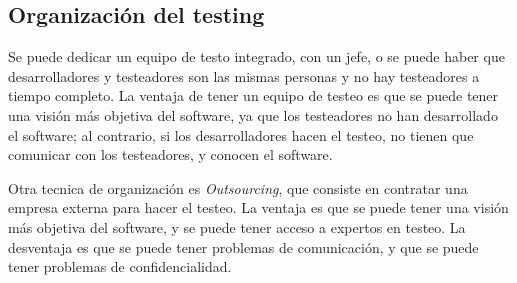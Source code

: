 \subsection{Organización del testing}
Se puede dedicar un equipo de testo integrado, con un jefe, o se puede haber que desarrolladores y testeadores son las mismas personas y no hay testeadores a tiempo completo.
La ventaja de tener un equipo de testeo es que se puede tener una visión más objetiva del software, ya que los testeadores no han desarrollado el software; al contrario, si los desarrolladores hacen el testeo, no tienen que comunicar con los testeadores, y conocen el software.

Otra tecnica de organización es \textit{Outsourcing}, que consiste en contratar una empresa externa para hacer el testeo. La ventaja es que se puede tener una visión más objetiva del software, y se puede tener acceso a expertos en testeo. La desventaja es que se puede tener problemas de comunicación, y que se puede tener problemas de confidencialidad.

